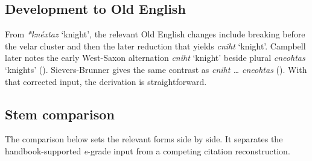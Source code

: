 \documentclass[
  british,
  a4paper,
  openany]{book}
\providecommand{\Recon}[1]{\emph{*#1}}
{\catcode`→=\active \global\def→{\ensuremath{\rightarrow}}}
\providecommand{\Recon}[1]{\emph{*#1}}
{\catcode`→=\active \global\def→{\ensuremath{\rightarrow}}}
\begin{document}
\subsection{Development to Old
English}\label{development-to-old-english-83}

From {\Recon{knéxtaz} `knight'}, the relevant Old English changes
include breaking before the velar cluster and then the later reduction
that yields {\emph{cniht}} `knight'. Campbell later notes the early
West-Saxon alternation {\emph{cniht}} `knight' beside plural
{\emph{cneohtas}} `knights' (). Sievers-Brunner gives the same contrast as \emph{cniht
\ldots{} cneohtas} (). With that corrected input, the derivation is
straightforward.

\subsection{Stem comparison}\label{stem-comparison-1}

The comparison below sets the relevant forms side by side. It separates
the handbook-supported \emph{e}-grade input from a competing citation
reconstruction.
\end{document}
